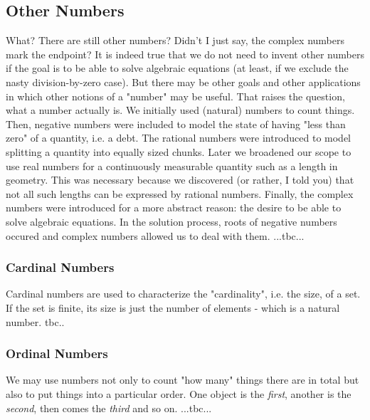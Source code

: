 \subsection{Other Numbers}
What? There are still other numbers? Didn't I just say, the complex numbers mark the endpoint? It is indeed true that we do not need to invent other numbers if the goal is to be able to solve algebraic equations (at least, if we exclude the nasty division-by-zero case). But there may be other goals and other applications in which other notions of a "number" may be useful. That raises the question, what a number actually is. We initially used (natural) numbers to count things. Then, negative numbers were included to model the state of having "less than zero" of a quantity, i.e. a debt. The rational numbers were introduced to model splitting a quantity into equally sized chunks. Later we broadened our scope to use real numbers for a continuously measurable quantity such as a length in geometry. This was necessary because we discovered (or rather, I told you) that not all such lengths can be expressed by rational numbers. Finally, the complex numbers were introduced for a more abstract reason: the desire to be able to solve algebraic equations. In the solution process, roots of negative numbers occured and complex numbers allowed us to deal with them. ...tbc...

\subsubsection{Cardinal Numbers}
Cardinal numbers are used to characterize the "cardinality", i.e. the size, of a set. If the set is finite, its size is just the number of elements - which is a natural number.  tbc..


\subsubsection{Ordinal Numbers}
We may use numbers not only to count "how many" things there are in total but also to put things into a particular order. One object is the \emph{first}, another is the \emph{second}, then comes the \emph{third} and so on. ...tbc...

